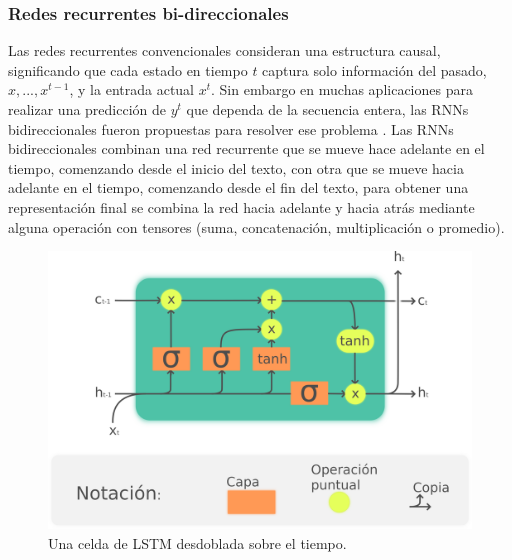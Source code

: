\subsubsection{Redes recurrentes bi-direccionales}
Las redes recurrentes convencionales consideran una estructura causal, significando que cada estado en tiempo $t$ captura solo información del pasado, $x,..., x^{t-1}$, y la entrada actual $x^t$. Sin embargo en muchas aplicaciones para realizar una predicción de $y^t$ que dependa de la secuencia entera, las RNNs bidireccionales fueron propuestas para resolver ese problema  \citep{schuster1997bidirectional}. Las RNNs bidireccionales combinan una red recurrente que se mueve hace adelante en el tiempo, comenzando desde el inicio del texto, con otra que se mueve hacia adelante en el tiempo, comenzando desde el fin del texto, para obtener una representación final se combina la red hacia adelante y hacia atrás mediante alguna operación con tensores (suma, concatenación, multiplicación o promedio). 



\begin{figure}[!t]
\centering
\includegraphics[width=0.7 \textwidth]{sections/figures/LSTM_cell2.png}
\caption{Una celda de LSTM desdoblada sobre el tiempo.} \label{fig:LSTM}
\end{figure}


